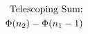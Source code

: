 \documentclass[preview]{standalone}
\begin{document}
\begin{align*}
\special{dvisvgm:raw <g id='unique000'>}\text{Telescoping Sum:}\\\Phi(n_2) - \Phi(n_1-1)\special{dvisvgm:raw </g>}
\end{align*}
\end{document}
